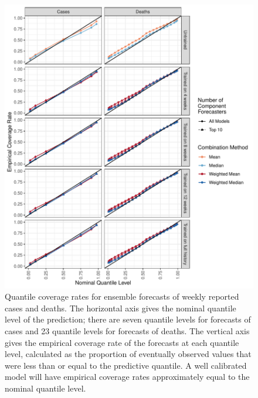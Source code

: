 \documentclass[review]{elsarticle}
\begin{document}
\begin{figure}
  \includegraphics[width=\textwidth]{figures/quantile_coverage_main.pdf}
  \caption{Quantile coverage rates for ensemble forecasts of weekly reported cases and deaths. The horizontal axis gives the nominal quantile level of the prediction; there are seven quantile levels for forecasts of cases and 23 quantile levels for forecasts of deaths.
  The vertical axis gives the empirical coverage rate of the forecasts at each quantile level, calculated as the proportion of eventually observed values that were less than or equal to the predictive quantile.
  A well calibrated model will have empirical coverage rates approximately equal to the nominal quantile level.}
  \label{fig:quantile_coverage_main}
\end{figure}
\end{document}
